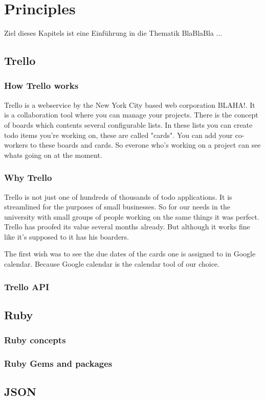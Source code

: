 
\chapter{Principles}
  \label{MatMet}

\noindent
Ziel dieses Kapitels ist eine Einf\"uhrung in die Thematik BlaBlaBla ...

\section{Trello}

\subsection{How Trello works}

Trello is a webservice by the New York City based web corporation BLAHA!. It is a collaboration tool where you can manage your projects. There is the concept of boards which contents several configurable lists. In these lists you can create todo items you're working on, these are called "cards". You can add your co-workers to these boards and cards. So everone who's working on a project can see whats going on at the moment.

\subsection{Why Trello}
Trello is not just one of hundreds of thousands of todo applications. It is streamlined for the purposes of small businesses. So for our needs in the university with small groups of people working on the same things it was perfect. Trello has proofed its value several months already. But although it works fine like it's supposed to it has his boarders.

The first wish was to see the due dates of the cards one is assigned to in Google calendar. Because Google calendar is the calendar tool of our choice.

\subsection{Trello API}

\section{Ruby}

\subsection{Ruby concepts}

\subsection{Ruby Gems and packages}

\section{JSON}